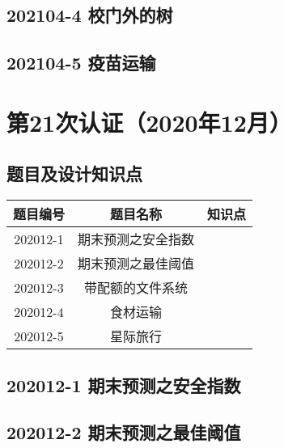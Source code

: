 \documentclass[cn,10pt,math=newtx,citestyle=gb7714-2015,bibstyle=gb7714-2015]{elegantbook}
\newif\ifonlyanalyze %
\begin{document}
\newpage
\section{202104-4 校门外的树}
\ifonlyanalyze
\else
    
\fi


\newpage
\section{202104-5 疫苗运输}
\ifonlyanalyze
\else
    
\fi



\chapter{第21次认证（2020年12月）}

\section{题目及设计知识点}

\begin{table}[htbp]
    \centering
    \begin{tabular}{ccc}
        \toprule
        题目编号 & 题目名称           & 知识点 \\
        \midrule
        202012-1 & 期末预测之安全指数 &        \\
        202012-2 & 期末预测之最佳阈值 &        \\
        202012-3 & 带配额的文件系统   &        \\
        202012-4 & 食材运输           &        \\
        202012-5 & 星际旅行           &        \\
        \bottomrule
    \end{tabular}
\end{table}

\newpage
\section{202012-1 期末预测之安全指数}
\ifonlyanalyze
\else
    
\fi


\newpage
\section{202012-2 期末预测之最佳阈值}
\ifonlyanalyze
\else
    
\fi

\end{document}
